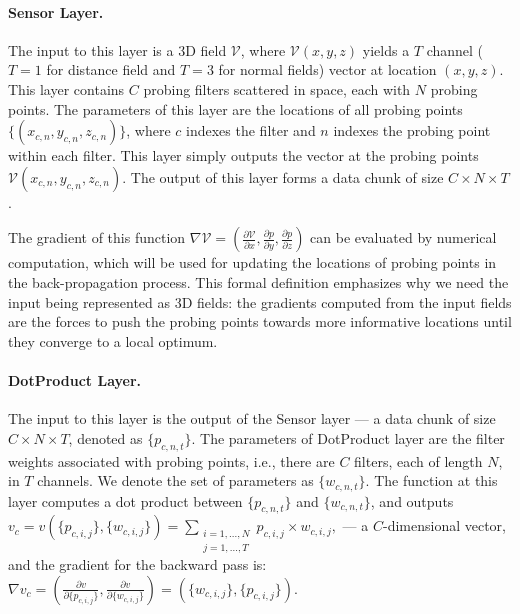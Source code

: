 \paragraph{Sensor Layer.} The input to this layer is a 3D field $\mathcal{V}$, where $\mathcal{V}(x,y,z)$ yields a $T$ channel ($T=1$ for distance field and $T=3$ for normal fields) vector at location $(x,y,z)$. This layer contains $C$ probing filters scattered in space, each with $N$ probing points. The parameters of this layer are the locations of all probing points $\{(x_{c,n},y_{c,n},z_{c,n})\}$, where $c$ indexes the filter and $n$ indexes the probing point within each filter. This layer simply outputs the vector at the probing points $\mathcal{V}(x_{c,n},y_{c,n},z_{c,n})$. The output of this layer forms a data chunk of size $C \times N \times T$.

The gradient of this function $\nabla \mathcal{V} =(\frac{\partial \mathcal{V}}{\partial x}, \frac{\partial p}{\partial y}, \frac{\partial p}{\partial z})$ can be evaluated by numerical computation, which will be used for updating the locations of probing points in the back-propagation process. This formal definition emphasizes why we need the input being represented as 3D fields: the gradients computed from the input fields are the forces to push the probing points towards more informative locations until they converge to a local optimum.

\paragraph{DotProduct Layer.} The input to this layer is the output of the Sensor layer --- a data chunk of size $C \times N \times T$, denoted as $\{p_{c,n,t}\}$. The parameters of DotProduct layer are the filter weights associated with probing points, i.e., there are $C$ filters, each of length $N$, in $T$ channels. We denote the set of parameters as $\{w_{c,n,t}\}$. The function at this layer computes a dot product between $\{p_{c,n,t}\}$ and $\{w_{c,n,t}\}$, and outputs
$
v_{c} = v(\{p_{c,i,j}\}, \{w_{c,i,j}\}) = \sum_{\substack{
   i=1,...,N \\
   j=1,...,T
  }} p_{c,i,j} \times w_{c,i,j},
$
--- a $C$-dimensional vector, and the gradient for the backward pass is:
$
\nabla v_c =(\frac{\partial v}{\partial \{p_{c,i,j}\}}, \frac{\partial v}{\partial \{w_{c,i,j}\}}) = (\{w_{c,i,j}\}, \{p_{c,i,j}\}).
$

